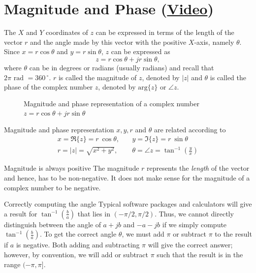 \section{Magnitude and Phase (\href{https://youtu.be/LHkYGsBxue4}{Video})}
The $X$ and $Y$ coordinates of $z$ can be expressed in terms of the length of the vector $r$ and the angle made by this vector with the positive $X$-axis, namely $\theta$. Since $x = r \cos \theta$ and $y = r \sin \theta$, $z$ can be expressed as
\begin{equation}
\label{eqn:polar1}
z = r \cos\theta + j r \sin\theta,
\end{equation}
where $\theta$ can be in degrees or radians (usually radians) and recall that $2 \pi \mbox{ rad } = 360\,^\circ$. $r$ is called the magnitude of $z$, denoted by $|z|$ and $\theta$ is called the phase of the complex number $z$, denoted by $\mbox{arg}\{z\}$ or $\angle z$.
\begin{figure}[h]
\begin{center}

\caption{Magnitude and phase representation of a complex number $z = r \cos \theta + j r \sin \theta$}
\label{fig:magphaserep}
\end{center}
\end{figure}

\begin{infobox}{Magnitude and phase representation}
$x,y,r$ and $\theta$ are related according to
\begin{eqnarray}
\nonumber
x  =  \Re\{z\} = r \ \cos \theta, & \ & y  =  \Im\{z\} = r \ \sin \theta \\
\label{eqn:magandphase}
r = |z| = \sqrt{x^2 + y^2},  & \ & \theta = \angle z = \tan^{-1}\left(\frac{y}{x} \right)
\end{eqnarray}
\end{infobox}

\begin{warningbox}{Magnitude is always positive}
The magnitude $r$ represents the {\em length} of the vector and hence, has to be non-negative. 
It does not make sense for the magnitude of a complex number to be negative.
\end{warningbox}

\begin{hintbox}{Correctly computing the angle}
Typical software packages and calculators will give a result for $\tan^{-1}\left(\frac{b}{a} \right)$ that lies in $(-\pi/2,\pi/2)$. Thus, we cannot directly distinguish between the angle of $a+jb$ and $-a-jb$ if we simply compute $\tan^{-1}\left(\frac{b}{a} \right)$.
To get the correct angle $\theta$, we must add $\pi$ or subtract $\pi$ to the result if $a$ is negative.
Both adding and subtracting $\pi$ will give the correct answer; however, by convention, we will add
or subtract $\pi$ such that the result is in the range $(-\pi,\pi]$.
\end{hintbox}

